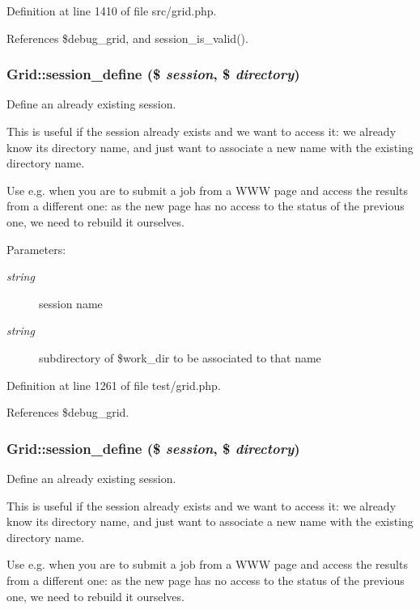Definition at line 1410 of file src/grid.php.

References \$debug\_\-grid, and session\_\-is\_\-valid().
\subsubsection{\setlength{\rightskip}{0pt plus 5cm}Grid::session\_\-define (\$ {\em session}, \$ {\em directory})}\label{classGrid_a40}


Define an already existing session. 

This is useful if the session already exists and we want to access it: we already know its directory name, and just want to associate a new name with the existing directory name.

Use e.g. when you are to submit a job from a WWW page and access the results from a different one: as the new page has no access to the status of the previous one, we need to rebuild it ourselves.

\begin{Desc}
\item[Parameters:]
\begin{description}
\item[{\em string}]session name \item[{\em string}]subdirectory of \$work\_\-dir to be associated to that name \end{description}
\end{Desc}


Definition at line 1261 of file test/grid.php.

References \$debug\_\-grid.
\subsubsection{\setlength{\rightskip}{0pt plus 5cm}Grid::session\_\-define (\$ {\em session}, \$ {\em directory})}\label{classGrid_a14}


Define an already existing session. 

This is useful if the session already exists and we want to access it: we already know its directory name, and just want to associate a new name with the existing directory name.

Use e.g. when you are to submit a job from a WWW page and access the results from a different one: as the new page has no access to the status of the previous one, we need to rebuild it ourselves.

